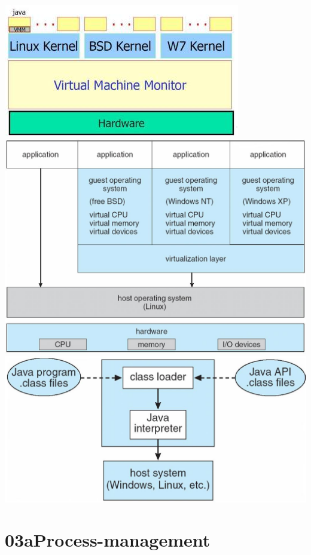 \documentclass[a4paper]{scrreprt}
\begin{document}
	\begin{center}
		\includegraphics[scale=0.5]{graphics/virtualmachine.png}
		\\
		\includegraphics[scale=0.35]{graphics/vmwarearchi.png}
		\\
		\includegraphics[scale=0.3]{graphics/javavm.png}
	\end{center}


\chapter{03aProcess-management}
\end{document}
